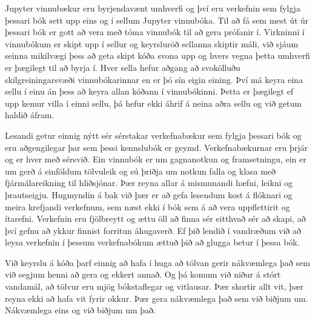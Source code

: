 Jupyter vinnubækur eru byrjendavænt umhverfi og því eru verkefnin sem fylgja þessari bók sett upp eins og í sellum Jupyter vinnubóka.
Til að fá sem mest út úr þessari bók er gott að vera með tóma vinnubók til að gera prófanir í. 
Virkninni í vinnubókum er skipt upp í sellur og keyrsluröð sellanna skiptir máli, við sjáum seinna mikilvægi þess að geta skipt kóða svona upp og hvers vegna þetta umhverfi er þægilegt til að byrja í. 
Hver sella hefur aðgang að svokölluðu skilgreiningarsvæði vinnubókarinnar en er þó sín eigin eining.
Því má keyra eina sellu í einu án þess að keyra allan kóðann í vinnubókinni.
Þetta er þægilegt ef upp kemur villa í einni sellu, þá hefur ekki áhrif á neina aðra sellu og við getum haldið áfram.

Lesandi getur einnig nýtt sér sérstakar verkefnabækur sem fylgja þessari bók og eru aðgengilegar þar sem þessi kennslubók er geymd.
Verkefnabækurnar eru þrjár og er hver með sérsvið.
Ein vinnubók er um gagnanotkun og framsetningu, ein er um gerð á einföldum tölvuleik og sú þriðja um notkun falla og klasa með fjármálareikning til hliðsjónar.
Þær reyna allar á mismunandi hæfni, leikni og þrautseigju.
Hugmyndin á bak við þær er að gefa lesendum kost á flóknari og meira krefjandi verkefnum, sem næst ekki í bók sem á að vera uppflettirit og ítarefni.
Verkefnin eru fjölbreytt og ættu öll að finna sér eitthvað sér að skapi, að því gefnu að ykkur finnist forritun áhugaverð.
Ef þið lendið í vandræðum við að leysa verkefnin í þessum verkefnabókum ættuð þið að glugga betur í þessa bók.

Við keyrslu á kóða þarf einnig að hafa í huga að tölvan gerir nákvæmlega það sem við segjum henni að gera og ekkert annað.
Og þá komum við niður á stórt vandamál, að tölvur eru mjög bókstaflegar og vitlausar.
Þær skortir allt vit, þær reyna ekki að hafa vit fyrir okkur. 
Þær gera nákvæmlega það sem við biðjum um.
Nákvæmlega eins og við biðjum um það.


